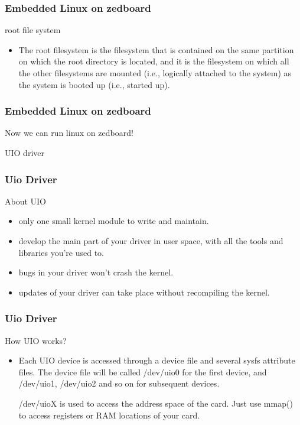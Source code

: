 \documentclass{beamer}
\begin{document}
\begin{frame}
\frametitle{Embedded Linux on zedboard}
\centering root file system
\centering \\
\begin{itemize}
	\item The root filesystem is the filesystem that is contained on the same partition on which the root directory is located, and it is the filesystem on which all the other filesystems are mounted (i.e., logically attached to the system) as the system is booted up (i.e., started up). 
\end{itemize}
\end{frame}


\begin{frame}
\frametitle{Embedded Linux on zedboard}
\centering Now we can run linux on zedboard!\\
\end{frame}

\begin{frame}
\centering UIO driver
\end{frame}


\begin{frame}
\frametitle{Uio Driver}
\centering About UIO
\centering \\
\begin{itemize}
\item only one small kernel module to write and maintain.
\item develop the main part of your driver in user space, with all the tools and libraries you’re used to.
\item bugs in your driver won’t crash the kernel.
\item updates of your driver can take place without recompiling the kernel.
\end{itemize}
\end{frame}

\begin{frame}
\frametitle{Uio Driver}
\centering How UIO works?\\

\begin{itemize}
\item Each UIO device is accessed through a device file and several sysfs attribute files. 
      The device file will be called /dev/uio0 for the first device, and /dev/uio1, /dev/uio2 and so on for subsequent devices.

/dev/uioX is used to access the address space of the card. Just use mmap() to access registers or RAM locations of your card.


\end{itemize}
\end{frame}
\end{document}
